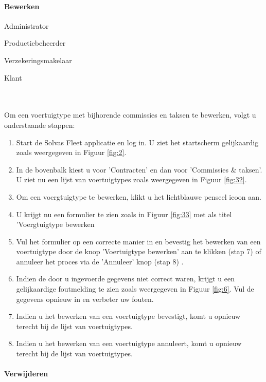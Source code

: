 \documentclass[11pt,openany]{article}
\newcommand{\cmark}{\ding{51}}%
\newcommand{\xmark}{\ding{55}}%
\newcommand{\done}{\rlap{$\square$}{\raisebox{2pt}{\large\hspace{1pt}\cmark}}%
	\hspace{-2.5pt}}
\newcommand{\wontfix}{\rlap{$\square$}{\large\hspace{1pt}\xmark}}
\begin{document}
\paragraph{Bewerken}
\begin{todolist}
	\item[\done] Administrator
	\item[\done] Productiebeheerder
	\item[\done] Verzekeringsmakelaar
	\item[\wontfix] Klant 
\end{todolist}
\\
\\
Om een voertuigtype met bijhorende commissies en taksen te bewerken, volgt u onderstaande stappen:
\begin{enumerate}
	\item Start de Solvas Fleet applicatie en log in. U ziet het startscherm gelijkaardig zoals weergegeven in Figuur \ref{fig:2}.
	\item In de bovenbalk kiest u voor 'Contracten' en dan voor 'Commissies \& taksen'. U ziet nu een lijst van voertuigtypes zoals weergegeven in Figuur \ref{fig:32}.
	\item Om een voergtuigtype te bewerken, klikt u het lichtblauwe penseel icoon aan. 
\item U krijgt nu een formulier te zien zoals in Figuur \ref{fig:33} met als titel 'Voergtuigtype bewerken
	\item Vul het formulier op een correcte manier in en bevestig het bewerken van een voertuigtype door de knop 'Voertuigtype bewerken' aan te klikken (stap 7) of annuleer het proces via de 'Annuleer' knop (stap 8) .
	\item Indien de door u ingevoerde gegevens niet correct waren, krijgt u een gelijkaardige foutmelding te zien zoals weergegeven in Figuur \ref{fig:6}. Vul de gegevens opnieuw in en verbeter uw fouten.
	\item Indien u het bewerken van een voertuigtype bevestigt, komt u opnieuw terecht bij de lijst van voertuigtypes. 
	\item Indien u het bewerken van een voertuigtype annuleert, komt u opnieuw terecht bij de lijst van voertuigtypes.
	
\end{enumerate}

\paragraph{Verwijderen}
\end{document}
